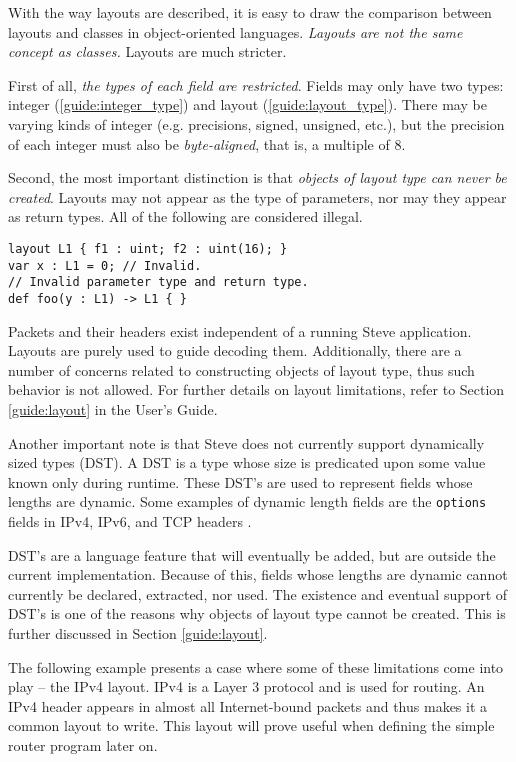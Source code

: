 With the way
layouts are described, it is easy to draw the comparison between layouts and
classes in object-oriented languages. \textit{Layouts are not the same concept as classes.} Layouts are much stricter.

First of all, \textit{the types of each field are restricted}. Fields may only
have two types: integer (\ref{guide:integer_type}) and layout
(\ref{guide:layout_type}). There may be varying kinds of integer (e.g.
precisions, signed, unsigned, etc.), but the precision of each integer must also
be \textit{byte-aligned}, that is, a multiple of 8.

Second, the most important distinction is that \textit{objects of layout type
can never be created}. Layouts may not appear as the type of parameters, nor may
they appear as return types. All of the following are considered illegal.

\begin{codepage}
\begin{lstlisting}
layout L1 { f1 : uint; f2 : uint(16); }
var x : L1 = 0; // Invalid.
// Invalid parameter type and return type.
def foo(y : L1) -> L1 { }
\end{lstlisting}
\end{codepage}

Packets and their headers exist independent of a running Steve application.
Layouts are purely used to guide decoding them. Additionally, there are a number
of concerns related to constructing objects of layout type, thus such behavior
is not allowed. For further details on layout limitations, refer to Section
\ref{guide:layout} in the User's Guide.

Another important note is that Steve does not currently support dynamically
sized types (DST). A DST is a type whose size is predicated upon some value
known only during runtime. These DST's are used to represent fields whose
lengths are dynamic. Some examples of dynamic length fields are the
\texttt{options} fields in IPv4, IPv6, and TCP headers \cite{ipv4_std, ipv6_std,
tcp_std}.

DST's are a language feature that will eventually be added, but are outside the
current implementation. Because of this, fields whose lengths are dynamic cannot
currently be declared, extracted, nor used. The existence and eventual support
of DST's is one of the reasons why objects of layout type cannot be created.
This is further discussed in Section \ref{guide:layout}.

The following example presents a case where some of these limitations come into
play -- the IPv4 layout. IPv4 is a Layer 3 protocol and is used
for routing. An IPv4 header appears in almost all Internet-bound packets and
thus makes it a common layout to write. This layout will prove useful when
defining the simple router program later on.

